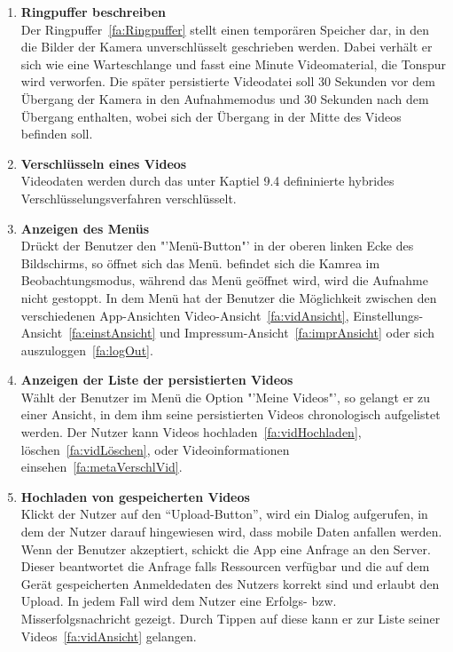 \begin{enumerate}
\item \label{fa:Ringpuffer}\textbf{Ringpuffer beschreiben} \hfill \\
Der Ringpuffer~\eqref{fa:Ringpuffer} stellt einen temporären Speicher dar, in den die Bilder der Kamera unverschlüsselt geschrieben werden. Dabei verhält er sich wie eine Warteschlange und fasst eine Minute Videomaterial, die Tonspur wird verworfen. Die später persistierte Videodatei soll 30 Sekunden vor dem Übergang der Kamera in den Aufnahmemodus und 30 Sekunden nach dem Übergang enthalten, wobei sich der Übergang in der Mitte des Videos befinden soll.

\item \label{fa:Verschluesselung}\textbf{Verschlüsseln eines Videos} \hfill \\
Videodaten werden durch das unter Kaptiel 9.4 defininierte hybrides Verschlüsselungsverfahren verschlüsselt.

\item \textbf{Anzeigen des Menüs} \hfill \\
Drückt der Benutzer den "'Menü-Button"' in der oberen linken Ecke des Bildschirms, so öffnet sich das Menü. befindet sich die Kamrea im Beobachtungsmodus, während das Menü geöffnet wird, wird die Aufnahme nicht gestoppt. In dem Menü hat der Benutzer die Möglichkeit zwischen den verschiedenen App-Ansichten Video-Ansicht~\eqref{fa:vidAnsicht}, Einstellungs-Ansicht~\eqref{fa:einstAnsicht} und Impressum-Ansicht~\eqref{fa:imprAnsicht} oder sich auszuloggen~\eqref{fa:logOut}.

\item \label{fa:vidAnsicht}\textbf{Anzeigen der Liste der persistierten Videos} \hfill \\
Wählt der Benutzer im Menü die Option "'Meine Videos"', so gelangt er zu einer Ansicht, in dem ihm seine persistierten Videos chronologisch aufgelistet werden. Der Nutzer kann Videos hochladen~\eqref{fa:vidHochladen}, löschen~\eqref{fa:vidLöschen}, oder Videoinformationen einsehen~\eqref{fa:metaVerschlVid}.

\item \label{fa:vidHochladen}\textbf{Hochladen von gespeicherten Videos} \hfill \\
Klickt der Nutzer auf den ``Upload-Button'', wird ein Dialog aufgerufen, in dem der Nutzer darauf hingewiesen wird, dass mobile Daten anfallen werden. Wenn der Benutzer akzeptiert, schickt die App eine Anfrage an den Server. Dieser beantwortet die Anfrage falls Ressourcen verfügbar und die auf dem Gerät gespeicherten Anmeldedaten des Nutzers korrekt sind und erlaubt den Upload. In jedem Fall wird dem Nutzer eine Erfolgs- bzw. Misserfolgsnachricht gezeigt. Durch Tippen auf diese kann er zur Liste seiner Videos~\eqref{fa:vidAnsicht} gelangen.


\end{enumerate}
